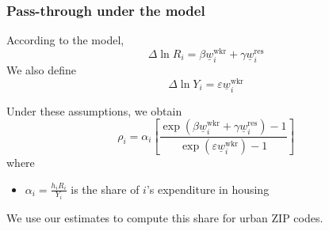 \documentclass[aspectratio=169, t]{beamer}
\newcommand{\MW}{\underline{w}}
\begin{document}
\begin{frame}
	\frametitle{Pass-through under the model}

	According to the model,
	$$
	\Delta \ln R_i = \beta \MW_i^{\text{wkr}} + \gamma \MW_i^{\text{res}}
	$$
	We also define
	$$
	\Delta \ln Y_i = \varepsilon \MW_i^{\text{wkr}}
	$$

	\pause
	\vspace{2mm}
	Under these assumptions, we obtain
	\begin{equation*}
		\rho_i = \alpha_i \left[
		   \frac{\exp \left( \beta \MW_i^{\text{wkr}} + \gamma \MW_i^{\text{res}} \right) - 1 }{\exp \left( \varepsilon \MW_i^{\text{wkr}} \right) - 1 }
		   \right]
	\end{equation*}
	where
	\begin{itemize}
		\item $\alpha_i = \frac{h_i R_i}{Y_i}$ is the share of $i$'s expenditure in housing
	\end{itemize}

	\vspace{2mm}
	We use our estimates to compute this share for urban ZIP codes.
\end{frame}
\end{document}
